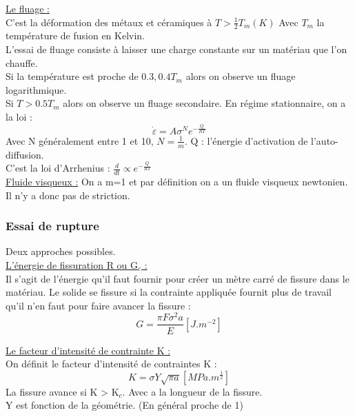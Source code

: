 \documentclass[../main.tex]{subfiles}
\begin{document}
\quad \underline{Le fluage :}\\
C'est la déformation des métaux et céramiques à $T>\frac{1}{2} T_m(K)$ Avec $T_m$ la température de fusion en Kelvin.\\

L'essai de fluage consiste à laisser une charge constante sur un matériau que l'on chauffe.\\
Si la température est proche de $0.3, 0.4 T_m$ alors on observe un fluage logarithmique.\\
Si $T> 0.5 T_m$ alors on observe un fluage secondaire. En régime stationnaire, on a la loi :\\
\begin{equation}
    \dot{\varepsilon} = A \sigma^N e^{-\frac{Q}{RT}}
\end{equation}
Avec N généralement entre 1 et 10, $N = \frac{1}{m}$. Q : l'énergie d'activation de l'auto-diffusion. \\
C'est la loi d'Arrhenius : $\frac{d}{dt} \propto e^{-\frac{Q}{RT}}$\\

\quad \underline{Fluide visqueux :} On a m=1 et par définition on a un fluide visqueux newtonien. Il n'y a donc pas de striction.\\

\subsubsection{Essai de rupture}
Deux approches possibles.\\
\quad \underline{L'énergie de fissuration R ou G$_c$ :}\\
Il s'agit de l'énergie qu'il faut fournir pour créer un mètre carré de fissure dans le matériau. Le solide se fissure si la contrainte appliquée fournit plus de travail qu'il n'en faut pour faire avancer la fissure : \\
\begin{equation}
    G = \frac{\pi F \sigma^2 a}{E} [J.m^{-2}]
\end{equation}

\quad \underline{Le facteur d'intensité de contrainte K :}\\
On définit le facteur d'intensité de contraintes K : \\
\begin{equation}
    K= \sigma Y \sqrt{\pi a} [MPa.m^{\frac{1}{2}}]
\end{equation}
La fissure avance si K > K$_c$. Avec a la longueur de la fissure. \\
Y est fonction de la géométrie. (En général proche de 1)\\
\end{document}
